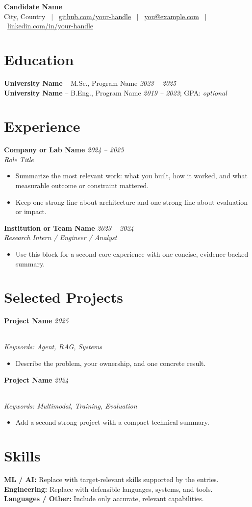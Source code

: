 \documentclass[a4paper,10pt]{extarticle}
\newcommand{\cvneedspace}[1]{%
  \par\ifdim\dimexpr\pagegoal-\pagetotal\relax<#1\relax\newpage\fi
}
\newcommand{\cvsection}[1]{\cvneedspace{4\baselineskip}\section{#1}}
\newcommand{\entry}[3]{%
  \cvneedspace{4\baselineskip}%
  \textbf{#1} \hfill \textit{#2}\\[-1pt]
  \textit{#3}
}
\newcommand{\project}[2]{%
  \cvneedspace{4\baselineskip}%
  \textbf{#1} \hfill \textit{#2}
}
\newcommand{\projectkeywords}[1]{%
  \\[-2pt]{\footnotesize\textit{Keywords: #1}}
}
\begin{document}
\pagestyle{empty}

\begin{center}
  {\LARGE\bfseries Candidate Name} \\[3pt]
  {\small City, Country \ $|$ \
  \href{https://github.com/your-handle}{github.com/your-handle} \ $|$ \
  \href{mailto:you@example.com}{you@example.com} \ $|$ \
  \href{https://www.linkedin.com/in/your-handle}{linkedin.com/in/your-handle}}
\end{center}

\cvsection{Education}
\cvneedspace{3\baselineskip}
\textbf{University Name} -- M.Sc., Program Name \hfill \textit{2023 -- 2025}\\
\textbf{University Name} -- B.Eng., Program Name \hfill \textit{2019 -- 2023}; GPA: \textit{optional}

\cvsection{Experience}
\entry{Company or Lab Name}{2024 -- 2025}{Role Title}
\vspace{-0.7em}
{\small
\begin{itemize}
  \item Summarize the most relevant work: what you built, how it worked, and what measurable outcome or constraint mattered.
  \item Keep one strong line about architecture and one strong line about evaluation or impact.
\end{itemize}
}

\entry{Institution or Team Name}{2023 -- 2024}{Research Intern / Engineer / Analyst}
\vspace{-0.7em}
{\small
\begin{itemize}
  \item Use this block for a second core experience with one concise, evidence-backed summary.
\end{itemize}
}

\cvsection{Selected Projects}
\project{Project Name}{2025}
\projectkeywords{Agent, RAG, Systems}
\vspace{-0.85em}
{\small
\begin{itemize}
  \item Describe the problem, your ownership, and one concrete result.
\end{itemize}
}

\project{Project Name}{2024}
\projectkeywords{Multimodal, Training, Evaluation}
\vspace{-0.85em}
{\small
\begin{itemize}
  \item Add a second strong project with a compact technical summary.
\end{itemize}
}

\cvsection{Skills}
{\scriptsize
\textbf{ML / AI:} Replace with target-relevant skills supported by the entries.\\
\textbf{Engineering:} Replace with defensible languages, systems, and tools.\\
\textbf{Languages / Other:} Include only accurate, relevant capabilities.
}
\end{document}
